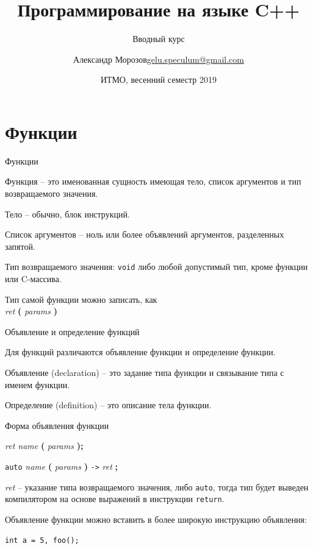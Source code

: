 \documentclass[unknownkeysallowed,xcolor=table]{beamer}
\title[C++]
{Программирование на языке C++}
\subtitle{Вводный курс}
\author[А.~Б.~Морозов]
{
  \texorpdfstring{Александр Морозов\newline\href{mailto:gelu.speculum@gmail.com}{gelu.speculum@gmail.com}}
  {Александр Морозов}
}
\date[ITMO 2019]
{ИТМО, весенний семестр 2019}
\begin{document}
\frame{\titlepage}


\section{Функции}

\begin{frame}{Функции}

Функция -- это именованная сущность имеющая тело, список аргументов и тип возвращаемого значения. \vspace{1.5em}

Тело -- обычно, блок инструкций. \vspace{1.5em}

Список аргументов -- ноль или более объявлений аргументов, разделенных запятой. \vspace{1.5em}

Тип возвращаемого значения: \lstinline{void} либо любой допустимый тип, кроме функции или C-массива. \vspace{1.5em}

Тип самой функции можно записать, как \\ \vspace{0.5em}
\emph{ret} \textbf{(} \emph{params} \textbf{)}

\end{frame}

\begin{frame}{Объявление и определение функций}

Для функций различаются объявление функции и определение функции. \vspace{2em}

Объявление (declaration) -- это задание типа функции и связывание типа с именем функции. \vspace{1.5em}

Определение (definition) -- это описание тела функции.

\end{frame}

\begin{frame}[fragile]{Форма объявления функции}

\emph{ret name} \textbf{(} \emph{params} \textbf{);} \vspace{1.5em}

\lstinline{auto} \emph{name} \textbf{(} \emph{params} \textbf{)} \lstinline{->} \emph{ret} \textbf{;} \vspace{1.5em}

\emph{ret} -- указание типа возвращаемого значения, либо \lstinline{auto}, тогда тип будет выведен компилятором на основе выражений в инструкции \lstinline{return}. \vspace{1.5em}

Объявление функции можно вставить в более широкую инструкцию объявления: 

\begin{lstlisting}
int a = 5, foo();
\end{lstlisting}

\end{frame}
\end{document}
